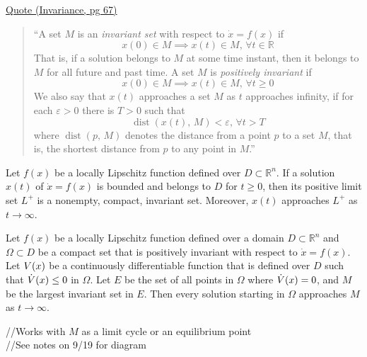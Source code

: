 \documentclass[twocolumn]{article}    %
\begin{document}
\noindent\underline{Quote (Invariance, pg 67)}
\begin{quote}
    ``A set \(M\) is an \emph{invariant set} with respect to \(\dot{x} = f(x)\) if
    \begin{equation*}
        x(0) \in M \implies x(t) \in M,\, \forall t \in \mathds{R}
    \end{equation*}
    That is, if a solution belongs to \(M\) at some time instant, then it belongs to \(M\) for all future and past time. A set \(M\) is \emph{positively invariant} if
    \begin{equation*}
        x(0) \in M \implies x(t) \in M,\, \forall t \geq 0
    \end{equation*}
    We also say that \(x(t)\) approaches a set \(M\) as \(t\) approaches infinity, if for each \(\varepsilon > 0\) there is \(T>0\) such that 
    \begin{equation*}
        \operatorname{dist}(x(t),\, M) < \varepsilon,\, \forall t > T
    \end{equation*}
    where \(\operatorname{dist}(p,\,M)\) denotes the distance from a point \(p\) to a set \(M\), that is, the shortest distance from \(p\) to any point in \(M\).''
\end{quote}

\begin{lemma}[3.1, pg 68]
    Let \(f(x)\) be a locally Lipschitz function defined over \(D\subset \mathds{R}^n\). If a solution \(x(t)\) of \(\dot{x} = f(x)\) is bounded and belongs to \(D\) for \(t\geq0\), then its positive limit set \(L^+\) is a nonempty, compact, invariant set. Moreover, \(x(t)\) approaches \(L^+\) as \(t \to \infty\).
\end{lemma}

\begin{remark}[3.4 LaSalle pg 68]
    Let \(f(x)\) be a locally Lipschitz function defined over a domain \(D\subset \mathds{R}^n\) and \(\Omega \subset D\) be a compact set that is positively invariant with respect to \(\dot{x} = f(x)\). Let \(V(x)\) be a continuously differentiable function that is defined over \(D\) such that \(\dot{V}(x) \leq 0\) in \(\Omega\). Let \(E\) be the set of all points in \(\Omega\) where \(\dot{V}(x) = 0\), and \(M\) be the largest invariant set in \(E\). Then every solution starting in \(\Omega\) approaches \(M\) as \(t\to \infty\).

    //Works with \(M\) as a limit cycle or an equilibrium point\\
    //See notes on 9/19 for diagram
    
\end{remark}
\end{document}
